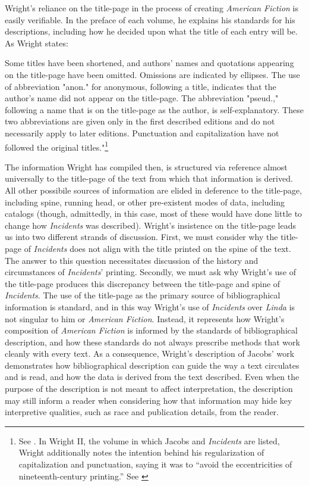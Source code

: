 Wright's reliance on the title-page in the process of creating \textit{American Fiction} is easily verifiable. In the preface of each volume, he explains his standards for his descriptions, including how he decided upon what the title of each entry will be. As Wright states: 
\begin{displayquote}
Some titles have been shortened, and authors' names and quotations appearing on the title-page have been omitted. Omissions are indicated by ellipses. The use of abbreviation "anon." for anonymous, following a title, indicates that the author's name did not appear on the title-page. The abbreviation "pseud.," following a name that is on the title-page as the author, is self-explanatory. These two abbreviations are given only in the first described editions and do not necessarily apply to later editions. Punctuation and capitalization have not followed the original titles."\footnote{See \autocite[ix]{wright_american_1939}. In Wright II, the volume in which Jacobs and \textit{Incidents} are listed, Wright additionally notes the intention behind his regularization of capitalization and punctuation, saying it was to ``avoid the eccentricities of nineteenth-century printing.'' See \autocite[x]{wright_american_1957}}
\end{displayquote}
The information Wright has compiled then, is structured via reference almost universally to the title-page of the text from which that information is derived. All other possibile sources of information are elided in deference to the title-page, including spine, running head, or other pre-existent modes of data, including catalogs (though, admittedly, in this case, most of these would have done little to change how \textit{Incidents} was described). Wright's insistence on the title-page leads us into two different strands of discussion. First, we must consider why the title-page of \textit{Incidents} does not align with the title printed on the spine of the text. The answer to this question necessitates discussion of the history and circumstances of \textit{Incidents}' printing. Secondly, we must ask why Wright's use of the title-page produces this discrepancy between the title-page and spine of \textit{Incidents}. The use of the title-page as the primary source of bibliographical information is standard, and in this way Wright's use of \textit{Incidents} over \textit{Linda} is not singular to him or \textit{American Fiction}. Instead, it represents how Wright's composition of \textit{American Fiction} is informed by the standards of bibliographical description, and how these standards do not always prescribe methods that work cleanly with every text. As a consequence, Wright's description of Jacobs' work demonstrates how bibliographical description can guide the way a text circulates and is read, and how the data is derived from the text described. Even when the purpose of the description is not meant to affect interpretation, the description may still inform a reader when considering how that information may hide key interpretive qualities, such as race and publication details, from the reader. 

